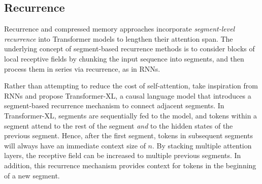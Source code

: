 

\subsection{Recurrence}

Recurrence and compressed memory approaches incorporate \textit{segment-level recurrence} into Transformer models to lengthen their attention span. The underlying concept of segment-based recurrence methods is to consider blocks of local receptive fields by chunking the input sequence into segments, and then process them in series via recurrence, as in \acp{RNN}.

Rather than attempting to reduce the cost of self-attention, \citet{dai2019transformer} take inspiration from \acp{RNN} and propose Transformer-XL, a causal language model that introduces a segment-based recurrence mechanism to connect adjacent segments. In Transformer-XL, segments are sequentially fed to the model, and tokens within a segment attend to the rest of the segment \textit{and} to the hidden states of the previous segment. Hence, after the first segment, tokens in subsequent segments will always have an immediate context size of $n$. By stacking multiple attention layers, the receptive field can be increased to multiple previous segments. In addition, this recurrence mechanism provides context for tokens in the beginning of a new segment. 
 

